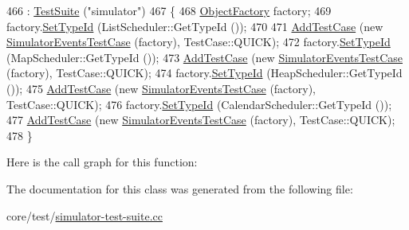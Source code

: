 \begin{DoxyCode}
466     : \hyperlink{classns3_1_1TestSuite_a904b0c40583b744d30908aeb94636d1a}{TestSuite} (\textcolor{stringliteral}{"simulator"})
467   \{
468     \hyperlink{classns3_1_1ObjectFactory}{ObjectFactory} factory;
469     factory.\hyperlink{classns3_1_1ObjectFactory_a77dcd099064038a1eb7a6b8251229ec3}{SetTypeId} (ListScheduler::GetTypeId ());
470 
471     \hyperlink{classns3_1_1TestCase_a3718088e3eefd5d6454569d2e0ddd835}{AddTestCase} (\textcolor{keyword}{new} \hyperlink{classSimulatorEventsTestCase}{SimulatorEventsTestCase} (factory), TestCase::QUICK);
472     factory.\hyperlink{classns3_1_1ObjectFactory_a77dcd099064038a1eb7a6b8251229ec3}{SetTypeId} (MapScheduler::GetTypeId ());
473     \hyperlink{classns3_1_1TestCase_a3718088e3eefd5d6454569d2e0ddd835}{AddTestCase} (\textcolor{keyword}{new} \hyperlink{classSimulatorEventsTestCase}{SimulatorEventsTestCase} (factory), TestCase::QUICK);
474     factory.\hyperlink{classns3_1_1ObjectFactory_a77dcd099064038a1eb7a6b8251229ec3}{SetTypeId} (HeapScheduler::GetTypeId ());
475     \hyperlink{classns3_1_1TestCase_a3718088e3eefd5d6454569d2e0ddd835}{AddTestCase} (\textcolor{keyword}{new} \hyperlink{classSimulatorEventsTestCase}{SimulatorEventsTestCase} (factory), TestCase::QUICK);
476     factory.\hyperlink{classns3_1_1ObjectFactory_a77dcd099064038a1eb7a6b8251229ec3}{SetTypeId} (CalendarScheduler::GetTypeId ());
477     \hyperlink{classns3_1_1TestCase_a3718088e3eefd5d6454569d2e0ddd835}{AddTestCase} (\textcolor{keyword}{new} \hyperlink{classSimulatorEventsTestCase}{SimulatorEventsTestCase} (factory), TestCase::QUICK);
478   \}
\end{DoxyCode}


Here is the call graph for this function\+:




The documentation for this class was generated from the following file\+:\begin{DoxyCompactItemize}
\item 
core/test/\hyperlink{simulator-test-suite_8cc}{simulator-\/test-\/suite.\+cc}\end{DoxyCompactItemize}
